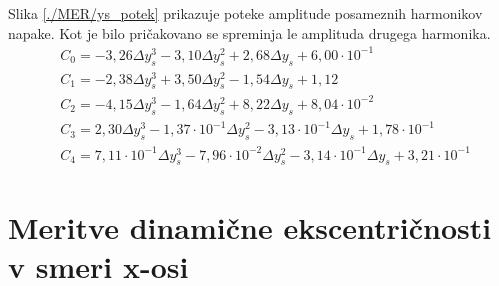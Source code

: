 Slika \ref{./MER/ys_potek} prikazuje poteke amplitude posameznih harmonikov napake. Kot je bilo pričakovano se spreminja le amplituda drugega harmonika. 
\begin{eqnarray}
&C_0 =-3,26\Delta y_s^{3}-3,10\Delta y_s^{2}+2,68\Delta y_s+6,00\cdot 10^{-1} \\                                      
&C_1 =-2,38\Delta y_s^{3}+3,50\Delta y_s^{2}-1,54\Delta y_s+1,12 \\                                                   
&C_2 =-4,15\Delta y_s^{3}-1,64\Delta y_s^{2}+8,22\Delta y_s+8,04\cdot 10^{-2} \\                                      
&C_3 =2,30\Delta y_s^{3}-1,37\cdot 10^{-1}\Delta y_s^{2}-3,13\cdot 10^{-1}\Delta y_s+1,78\cdot 10^{-1} \\             
&C_4 =7,11\cdot 10^{-1}\Delta y_s^{3}-7,96\cdot 10^{-2}\Delta y_s^{2}-3,14\cdot 10^{-1}\Delta y_s+3,21\cdot 10^{-1}
\end{eqnarray}







\section{Meritve dinamične ekscentričnosti v smeri x-osi}

